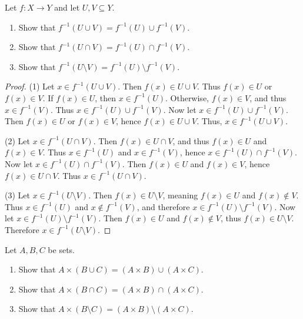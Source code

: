 \documentclass[11pt, letterpaper]{article}
\theoremstyle{definition}
\begin{document}
\begin{problem}[Exercise 3.4.4]
	Let $f : X \to Y$ and let $U,V\subseteq Y$.
	\begin{enumerate}[label=(\arabic*), align=right]
		\item Show that $f^{-1} (U \cup V) = f^{-1} (U)\cup f^{-1} (V)$.
		\item Show that $f^{-1} (U \cap V)=f^{-1} (U) \cap f^{-1} (V)$.
		\item Show that $f^{-1} (U\setminus V) = f^{-1} (U) \setminus f^{-1} (V)$.
	\end{enumerate}
\end{problem}
\begin{proof}
	(1) Let $x\in f^{-1} (U \cup V)$. Then $f(x)\in U \cup V$. Thus $f(x)\in U$ or $f(x)\in V$. If $f(x)\in U$, then $x\in f^{-1} (U)$. Otherwise, $f(x)\in V$, and thus $x\in f^{-1} (V)$. Thus $x\in f^{-1} (U) \cup f^{-1} (V)$. Now let $x\in f^{-1} (U)\cup f^{-1} (V)$. Then $f(x)\in U$ or $f(x)\in V$, hence $f(x)\in U \cup V$. Thus, $x\in f^{-1} (U \cup V)$.

	(2) Let $x\in f^{-1} (U \cap V)$. Then $f(x)\in U \cap V$, and thus $f(x)\in U$ and $f(x)\in V$. Thus $x\in f^{-1} (U)$ and $x\in f^{-1} (V)$, hence $x\in f^{-1} (U)\cap f^{-1} (V)$. Now let $x\in f^{-1} (U) \cap f^{-1} (V)$. Then $f(x)\in U$ and $f(x)\in V$, hence $f(x)\in U \cap V$. Thus $x\in f^{-1} (U \cap V)$.

	(3) Let $x\in f^{-1} (U\setminus V)$. Then $f(x)\in U\setminus V$, meaning $f(x)\in U$ and $f(x)\notin V$. Thus $x\in f^{-1} (U)$ and $x\notin f^{-1} (V)$, and therefore $x\in f^{-1} (U)\setminus f^{-1} (V)$. Now let $x\in f^{-1} (U)\setminus f^{-1} (V)$. Then $f(x)\in U$ and $f(x)\notin V$, thus $f(x)\in U\setminus V$. Therefore $x\in f^{-1} (U\setminus V)$.
\end{proof}
\begin{problem}[Exercise 3.5.4]
	Let $A,B,C$ be sets.
	\begin{enumerate}[label=(\arabic*), align=right]
		\item Show that $A\times (B \cup C) = (A\times B)\cup (A\times C)$.
		\item Show that $A\times (B \cap C) = (A\times B)\cap (A\times C)$.
		\item Show that $A\times (B\setminus C) = (A\times B)\setminus (A\times C)$.
	\end{enumerate}
\end{problem}
\end{document}
